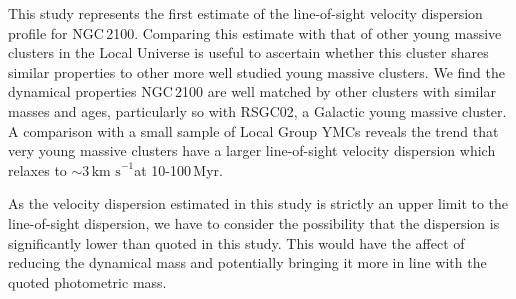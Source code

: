 \documentclass[useAMS,usenatbib]{mn2e}
\def\kms{$\mbox{km s}^{-1}$}
\begin{document}
This study represents the first estimate of the line-of-sight velocity dispersion profile for NGC\,2100.
Comparing this estimate with that of other young massive clusters in the Local Universe is useful to ascertain whether this cluster shares similar properties to other more well studied young massive clusters.
We find the dynamical properties NGC\,2100 are well matched by other clusters with similar masses and ages, particularly so with RSGC02, a Galactic young massive cluster.
A comparison with a small sample of Local Group YMCs reveals the trend that very young massive clusters have a larger line-of-sight velocity dispersion which relaxes to $\sim$3\,\kms at 10-100\,Myr.

As the velocity dispersion estimated in this study is strictly an upper limit to the line-of-sight dispersion, we have to consider the possibility that the dispersion is significantly lower than quoted in this study.
This would have the affect of reducing the dynamical mass and potentially bringing it more in line with the quoted photometric mass.




\end{document}
